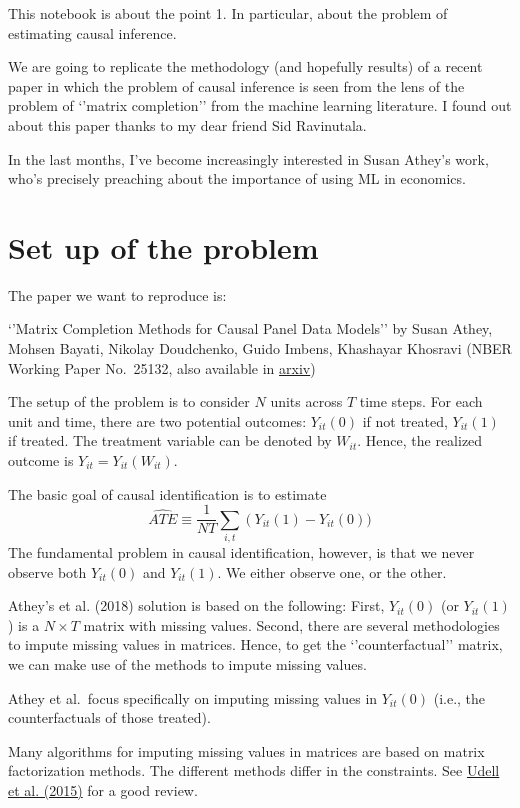 \documentclass[11pt]{article}
\begin{document}
This notebook is about the point 1. In particular, about the problem of
estimating causal inference.

    We are going to replicate the methodology (and hopefully results) of a
recent paper in which the problem of causal inference is seen from the
lens of the problem of `'matrix completion'' from the machine learning
literature. I found out about this paper thanks to my dear friend Sid
Ravinutala.

    In the last months, I've become increasingly interested in Susan Athey's
work, who's precisely preaching about the importance of using ML in
economics.

    \hypertarget{set-up-of-the-problem}{%
\section{Set up of the problem}\label{set-up-of-the-problem}}

    The paper we want to reproduce is:

`'Matrix Completion Methods for Causal Panel Data Models'' by Susan
Athey, Mohsen Bayati, Nikolay Doudchenko, Guido Imbens, Khashayar
Khosravi (NBER Working Paper No.~25132, also available in
\href{https://arxiv.org/pdf/1710.10251.pdf}{arxiv})

    The setup of the problem is to consider \(N\) units across \(T\) time
steps. For each unit and time, there are two potential outcomes:
\(Y_{it}(0)\) if not treated, \(Y_{it}(1)\) if treated. The treatment
variable can be denoted by \(W_{it}\). Hence, the realized outcome is
\(Y_{it}=Y_{it}(W_{it})\).

The basic goal of causal identification is to estimate
\[\widehat{ATE} \equiv \frac{1}{NT}\sum_{i,t}\left(Y_{it}(1) - Y_{it}(0)\right.)\]
The fundamental problem in causal identification, however, is that we
never observe both \(Y_{it}(0)\) and \(Y_{it}(1)\). We either observe
one, or the other.

    Athey's et al. (2018) solution is based on the following: First,
\(Y_{it}(0)\) (or \(Y_{it}(1)\)) is a \(N\times T\) matrix with missing
values. Second, there are several methodologies to impute missing values
in matrices. Hence, to get the `'counterfactual'' matrix, we can make
use of the methods to impute missing values.

Athey et al.~focus specifically on imputing missing values in
\(Y_{it}(0)\) (i.e., the counterfactuals of those treated).

Many algorithms for imputing missing values in matrices are based on
matrix factorization methods. The different methods differ in the
constraints. See \href{https://arxiv.org/pdf/1410.0342.pdf}{Udell et al.
(2015)} for a good review.
\end{document}
